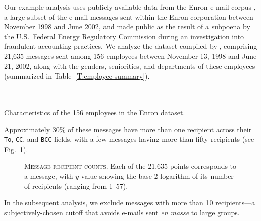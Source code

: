 \documentclass[final]{statsoc}
\begin{document}
Our example analysis uses publicly available data from the Enron e-mail
corpus \citep{cohen2009enron}, a large subset of the e-mail messages sent
within the Enron corporation between November 1998 and June 2002, and made
public as the result of a subpoena by the U.S.~Federal Energy Regulatory
Commission during an investigation into fraudulent accounting practices.
We analyze the dataset compiled by \citet{zhou2007strategies}, comprising
21,635 messages sent among 156 employees between November 13, 1998 and
June 21, 2002, along with the genders, seniorities, and departments of
these employees (summarized in Table~\ref{T:employee-summary}).
\begin{table}
    \makebox[0.66\textwidth]{}
    \\
    \\
    \caption{
        Characteristics of the 156 employees in the Enron dataset.
    }
    \label{T:employee-summary}
\end{table}
Approximately 30\% of these messages have more than one recipient across
their \texttt{To}, \texttt{CC}, and \texttt{BCC} fields, with a few
messages having more than fifty recipients
(see Fig.~\ref{F:recipient-counts}).
\begin{figure}
    \centering
    \caption{
        \textsc{Message recipient counts.}
        Each of the 21,635 points corresponds to a message, with
        $y$-value showing the base-2 logarithm of its number of recipients
        (ranging from 1--57).
    }\label{F:recipient-counts}
\end{figure}
In the subsequent analysis, we exclude messages with more than 10
recipients---a subjectively-chosen cutoff that avoids e-mails sent
\emph{en masse} to large groups.
\end{document}
